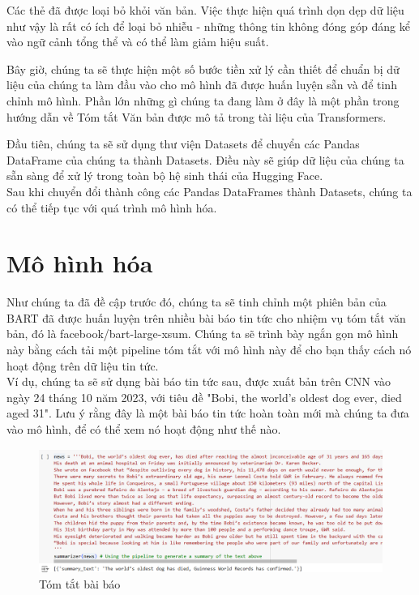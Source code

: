 Các thẻ đã được loại bỏ khỏi văn bản. Việc thực hiện quá trình dọn dẹp dữ liệu như vậy là rất có ích để loại bỏ nhiễu - những thông tin không đóng góp đáng kể vào ngữ cảnh tổng thể và có thể làm giảm hiệu suất.

Bây giờ, chúng ta sẽ thực hiện một số bước tiền xử lý cần thiết để chuẩn bị dữ liệu của chúng ta làm đầu vào cho mô hình đã được huấn luyện sẵn và để tinh chỉnh mô hình. Phần lớn những gì chúng ta đang làm ở đây là một phần trong hướng dẫn về Tóm tắt Văn bản được mô tả trong tài liệu của Transformers.

Đầu tiên, chúng ta sẽ sử dụng thư viện Datasets để chuyển các Pandas DataFrame của chúng ta thành Datasets. Điều này sẽ giúp dữ liệu của chúng ta sẵn sàng để xử lý trong toàn bộ hệ sinh thái của Hugging Face.\\



Sau khi chuyển đổi thành công các Pandas DataFrames thành Datasets, chúng ta có thể tiếp tục với quá trình mô hình hóa.\\

\section{Mô hình hóa}
Như chúng ta đã đề cập trước đó, chúng ta sẽ tinh chỉnh một phiên bản của BART đã được huấn luyện trên nhiều bài báo tin tức cho nhiệm vụ tóm tắt văn bản, đó là facebook/bart-large-xsum.
Chúng ta sẽ trình bày ngắn gọn mô hình này bằng cách tải một pipeline tóm tắt với mô hình này để cho bạn thấy cách nó hoạt động trên dữ liệu tin tức.\\



Ví dụ, chúng ta sẽ sử dụng bài báo tin tức sau, được xuất bản trên CNN vào ngày 24 tháng 10 năm 2023, với tiêu đề "Bobi, the world's oldest dog ever, died aged 31". Lưu ý rằng đây là một bài báo tin tức hoàn toàn mới mà chúng ta đưa vào mô hình, để có thể xem nó hoạt động như thế nào.\\
\pagebreak
\begin{figure}[htp]
    \centering
    \includegraphics[scale=.7]{images/news.png}
    \caption{Tóm tắt bài báo}
    \end{figure}


